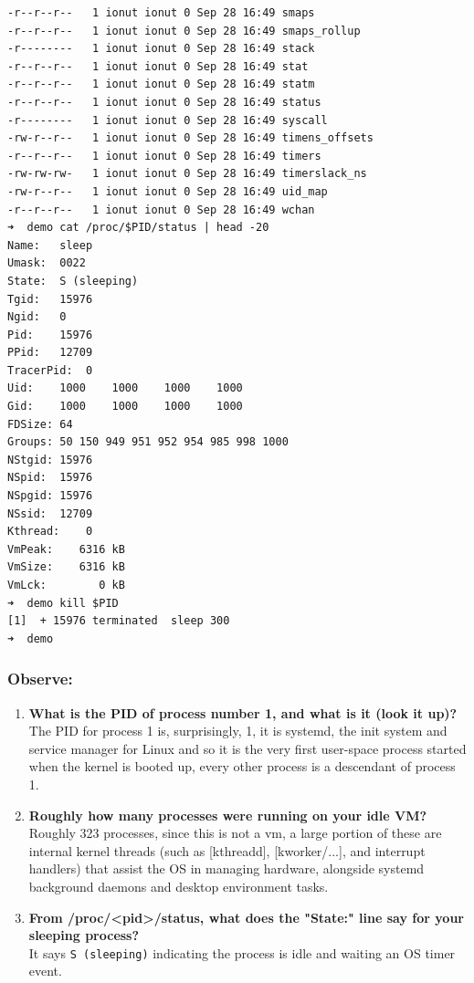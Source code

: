 \documentclass{labreport}
\begin{document}
\begin{lstlisting}[style=bash]
-r--r--r--   1 ionut ionut 0 Sep 28 16:49 smaps
-r--r--r--   1 ionut ionut 0 Sep 28 16:49 smaps_rollup
-r--------   1 ionut ionut 0 Sep 28 16:49 stack
-r--r--r--   1 ionut ionut 0 Sep 28 16:49 stat
-r--r--r--   1 ionut ionut 0 Sep 28 16:49 statm
-r--r--r--   1 ionut ionut 0 Sep 28 16:49 status
-r--------   1 ionut ionut 0 Sep 28 16:49 syscall
-rw-r--r--   1 ionut ionut 0 Sep 28 16:49 timens_offsets
-r--r--r--   1 ionut ionut 0 Sep 28 16:49 timers
-rw-rw-rw-   1 ionut ionut 0 Sep 28 16:49 timerslack_ns
-rw-r--r--   1 ionut ionut 0 Sep 28 16:49 uid_map
-r--r--r--   1 ionut ionut 0 Sep 28 16:49 wchan
➜  demo cat /proc/$PID/status | head -20
Name:	sleep
Umask:	0022
State:	S (sleeping)
Tgid:	15976
Ngid:	0
Pid:	15976
PPid:	12709
TracerPid:	0
Uid:	1000	1000	1000	1000
Gid:	1000	1000	1000	1000
FDSize:	64
Groups:	50 150 949 951 952 954 985 998 1000
NStgid:	15976
NSpid:	15976
NSpgid:	15976
NSsid:	12709
Kthread:	0
VmPeak:	   6316 kB
VmSize:	   6316 kB
VmLck:	      0 kB
➜  demo kill $PID
[1]  + 15976 terminated  sleep 300
➜  demo
\end{lstlisting}

\subsubsection*{Observe:}
\begin{enumerate}[leftmargin=*]
    \item \textbf{What is the PID of process number 1, and what is it (look it up)?}\\[0.2em]
    The PID for process 1 is, surprisingly, 1, it is systemd, the init system and service manager for Linux and so it is the very first user-space process started when the kernel is booted up, every other process is a descendant of process 1.

    \item \textbf{Roughly how many processes were running on your idle VM?}\\[0.2em]
    Roughly 323 processes, since this is not a vm, a large portion of these are internal kernel threads (such as [kthreadd], [kworker/...], and interrupt handlers) that assist the OS in managing hardware, alongside systemd background daemons and desktop environment tasks.

    \item \textbf{From /proc/<pid>/status, what does the "State:" line say for your sleeping process?}\\[0.2em]
    It says \texttt{S (sleeping)} indicating the process is idle and waiting an OS timer event.
\end{enumerate}
\end{document}
